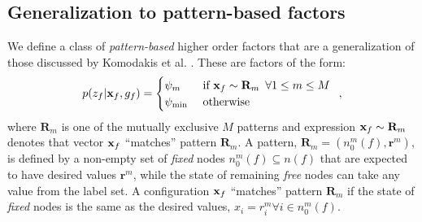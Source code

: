\documentclass[letterpaper, 10 pt, conference]{ieeeconf} %
\newcommand{\vect}[1]{\mathbf{#1}}
\begin{document}
\subsection{Generalization to pattern-based factors}
\label{sec:patternfunctions}

We define a class of \emph{pattern-based} higher order factors that
are a generalization of those discussed by Komodakis et al.
\cite{komodakis2009beyond}. These are factors of the form:
\begin{align}
  p(z_f|\map_f, g_f) = \begin{cases}
    \psi_{m} & \text{ if $\map_f \sim \vect{R}_m$} \,\,\, \forall 1 \le m \le M\\
    \psi_{\text{min}} & \text{ otherwise}
  \end{cases}
  \enspace,
  \label{eq:patternfunction}
\end{align}
where $\vect{R}_m$ is one of the mutually exclusive $M$ patterns and
expression $\map_f \sim \vect{R}_m$ denotes that vector $\map_f$
``matches'' pattern $\vect{R}_m$.  
A pattern, $\vect{R}_m = (n^m_0(f), \vect{r}^m)$, is defined by a non-empty set
of \emph{fixed} nodes $n^m_0(f) \subseteq n(f)$ that are expected to have
desired values $\vect{r}^m$, while the state of remaining \emph{free} nodes
can take any value from the label set.
A configuration
$\map_f$ ``matches'' pattern $\vect{R}_m$ if the state of \emph{fixed}
nodes is the same as the desired values, $x_i = r^m_i \forall i \in n^m_0(f)$.
\end{document}
